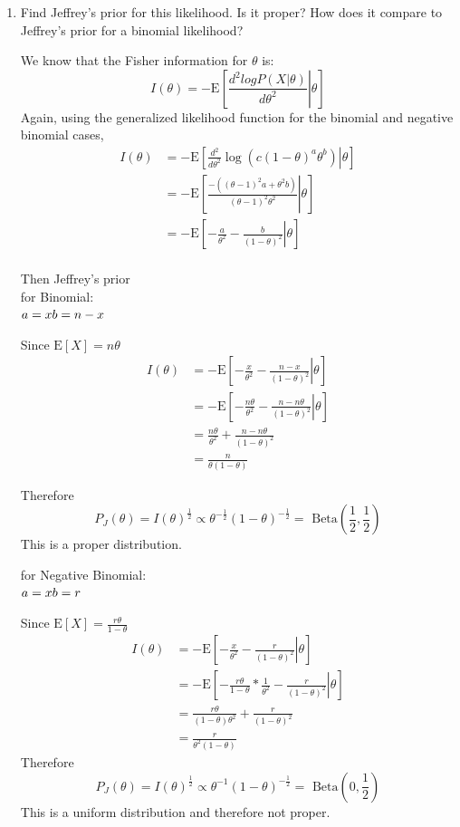 \documentclass[11pt]{article}
\newcommand{\E}{\mathrm{E}}
\newcommand{\Beta}{\text{ Beta}}
\theoremstyle{definition}
\theoremstyle{remark}
\theoremstyle{definition}
\begin{document}
\begin{enumerate}
\begin{enumerate}
		\item Find Jeffrey’s prior for this likelihood. Is it proper? How does it compare to Jeffrey’s prior for a binomial likelihood?
			
			We know that the Fisher information for $\theta$ is: 
			$$I(\theta) = -\E \left[ \left. \frac{d^2 log P(X|\theta)}{d\theta^2} \right| \theta \right]$$ 		
Again, using the generalized likelihood function for the binomial and negative binomial cases,
\begin{align*}
	I(\theta) &= -\E \left[ \left.\frac{d^2}{d\theta^2}\log (c (1-\theta)^a \theta^b)  \right| \theta \right]\\
	 &= -\E \left[ \left.\frac{-((\theta-1)^2 a+\theta^2 b)}{(\theta-1)^2 \theta^2}\right| \theta \right]\\
	 &= -\E \left[ \left. -\frac{a}{\theta^2}-\frac{b}{(1-\theta)^2} \right| \theta \right]\\
\end{align*}		
		
Then Jeffrey's prior \\
for Binomial: \\
$ a = x \\ b = n-x $

Since $\E[X] = n\theta$
\begin{align*}
	I(\theta) 
	&= -\E \left[ \left. -\frac{x}{\theta^2}-\frac{n-x}{(1-\theta)^2} \right| \theta \right]\\
	&= -\E \left[ \left. -\frac{n\theta}{\theta^2}-\frac{n-n\theta}{(1-\theta)^2} \right| \theta \right]\\
	&= \frac{n\theta}{\theta^2}+\frac{n-n\theta}{(1-\theta)^2}\\
	&= \frac{n}{\theta(1-\theta)}
\end{align*}

Therefore $$P_J(\theta) = I(\theta)^{\frac{1}{2}} \propto \theta^{-\frac{1}{2}}(1-\theta)^{-\frac{1}{2}}= \Beta \left(\frac{1}{2},\frac{1}{2}\right)$$
This is a proper distribution. 

for Negative Binomial:\\ 
$ a = x \\ b = r $

Since $\E[X] = \frac{r\theta}{1-\theta}$
\begin{align*}
	I(\theta) 
	&= -\E \left[ \left. -\frac{x}{\theta^2}-\frac{r}{(1-\theta)^2} \right| \theta \right]\\
	&= -\E \left[ \left. -\frac{r\theta}{1-\theta}*\frac{1}{\theta^2}-\frac{r}{(1-\theta)^2} \right| \theta \right]\\
	&= \frac{r\theta}{(1-\theta)\theta^2}+\frac{r}{(1-\theta)^2}\\
	&= \frac{r}{\theta^2(1-\theta)}
\end{align*}
Therefore $$P_J(\theta) = I(\theta)^{\frac{1}{2}} \propto \theta^{-1}(1-\theta)^{-\frac{1}{2}} = \Beta \left( 0,\frac{1}{2} \right)$$
	This is a uniform distribution and therefore not proper. 
	\end{enumerate}
\end{enumerate}
\end{document}
